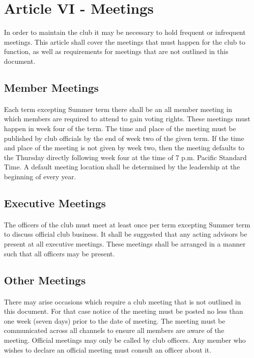 \documentclass[12pt]{article}
\newcommand{\article}[1]{
\setcounter{section}{0}
\setcounter{subsection}{0}

	\section*{#1}
	\addcontentsline{toc}{section}{#1}
	
}
\begin{document}
\article{Article VI - Meetings}
\paragraph{}
In order to maintain the club it may be necessary to hold frequent or infrequent meetings. This article shall cover the meetings that must happen for the club to function, as well as requirements for meetings that are not outlined in this document.

\subsection{Member Meetings}
\paragraph{}
Each term excepting Summer term there shall be an all member meeting in which members are required to attend to gain voting rights. 
These meetings must happen in week four of the term. 
The time and place of the meeting must be published by club officials by the end of week two of the given term. 
If the time and place of the meeting is not given by week two, then the meeting defaults to the Thursday directly following week four at the time of 7 p.m. Pacific Standard Time. A default meeting location shall be determined by the leadership at the beginning of every year.

\subsection{Executive Meetings}
\paragraph{}
The officers of the club must meet at least once per term excepting Summer term to discuss official club business.
It shall be suggested that any acting advisors be present at all executive meetings. 
These meetings shall be arranged in a manner such that all officers may be present.

\subsection{Other Meetings}
\paragraph{}
There may arise occasions which require a club meeting that is not outlined in this document. For that case notice of the meeting must be posted no less than one week (seven days) prior to the date of meeting. The meeting must be communicated across all channels to ensure all members are aware of the meeting. Official meetings may only be called by club officers. Any member who wishes to declare an official meeting must consult an officer about it.
\end{document}
